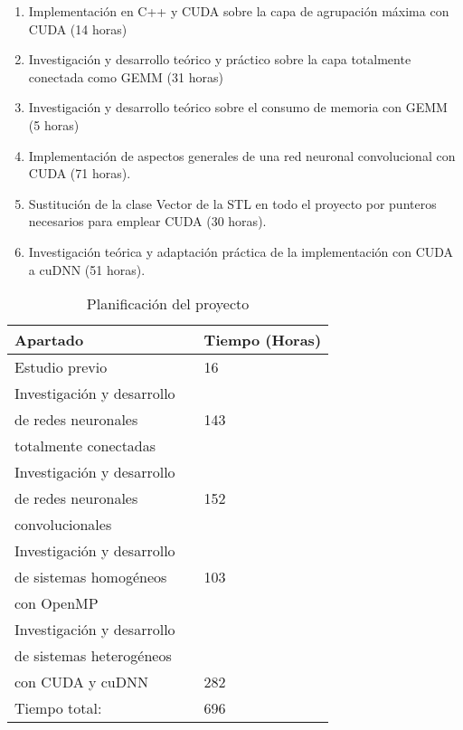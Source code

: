 \begin{enumerate}[label=\textbullet]
\begin{enumerate}[label=\textbullet]
		\item Implementación en C++ y CUDA sobre la capa de agrupación máxima con CUDA (14 horas)
		\item Investigación y desarrollo teórico y práctico sobre la capa totalmente conectada como GEMM (31 horas)
		\item Investigación y desarrollo teórico sobre el consumo de memoria con GEMM (5 horas)
		\item Implementación de aspectos generales de una red neuronal convolucional con CUDA (71 horas).
		\item Sustitución de la clase Vector de la STL en todo el proyecto por punteros necesarios para emplear CUDA (30 horas).
		\item Investigación teórica y adaptación práctica de la implementación con CUDA a cuDNN (51 horas).
	\end{enumerate}
	
\end{enumerate}


\begin{table}[H]
	\centering
	\begin{tabular}{|lll|}
		\hline
		Apartado 	 &\vline  & Tiempo (Horas) \\
		\hline
		
		Estudio previo    & \vline & 16 \\			
		\hline
		Investigación y desarrollo  	 & \vline & 	\\
		de redes neuronales  	 & \vline & 143	\\
		totalmente conectadas 	 & \vline & 	\\
		\hline
		Investigación y desarrollo    & \vline & 	 \\	
		de redes neuronales    & \vline & 152	 \\			
		convolucionales    & \vline & 	 \\					
		\hline
		Investigación y desarrollo  	 & \vline & 	 \\
		de sistemas homogéneos  	 & \vline & 103	 \\
		con OpenMP 	 & \vline & 	 \\
		\hline
		Investigación y desarrollo     & \vline &  	\\
		de sistemas heterogéneos    & \vline &  \\ 
		con CUDA y cuDNN    & \vline & 282 \\ 	
		\hline
		\hline
		Tiempo total:				& \vline & 696 \\
		\hline
	\end{tabular}
	\caption{Planificación del proyecto}
	\label{tabla_planificación_aprendice}
\end{table}